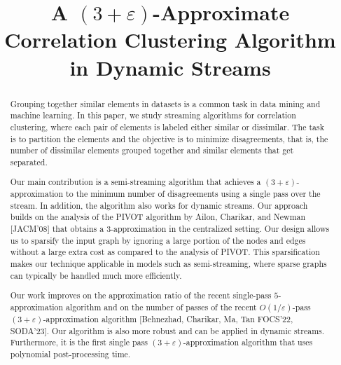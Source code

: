 \documentclass{theoretics}
\title{A \texorpdfstring{$(3+\varepsilon)$}{(3+epsilon)}-Approximate Correlation Clustering Algorithm in Dynamic Streams}
\begin{document}
\maketitle

\begin{abstract}
  Grouping together similar elements in datasets is a common task in data mining and machine learning. In this paper, we study streaming algorithms for correlation clustering, where each pair of elements is labeled either similar or dissimilar. The task is to partition the elements and the objective is to minimize disagreements, that is, the number of dissimilar elements grouped together and similar elements that get separated.
  
  Our main contribution is a semi-streaming algorithm that achieves a $(3 + \varepsilon)$-approximation to the minimum number of disagreements using a single pass over the stream. In addition, the algorithm also works for dynamic streams.
  Our approach builds on the analysis of the PIVOT algorithm by Ailon, Charikar, and Newman [JACM'08] that obtains a $3$-approximation in the centralized setting.
  Our design allows us to sparsify the input graph by ignoring a large portion of the nodes and edges without a large extra cost as compared to the analysis of PIVOT.
  This sparsification makes our technique applicable in models such as semi-streaming, where sparse graphs can typically be handled much more efficiently.
  
  Our work improves on the approximation ratio of the recent single-pass $5$-approximation algorithm and on the number of passes of the recent $O(1/\varepsilon)$-pass $(3 + \varepsilon)$-approximation algorithm [Behnezhad, Charikar, Ma, Tan FOCS'22, SODA'23]. Our algorithm is also more robust and can be applied in dynamic streams.
  Furthermore, it is the first single pass $(3 + \varepsilon)$-approximation algorithm that uses polynomial post-processing time.
\end{abstract}


\end{document}
